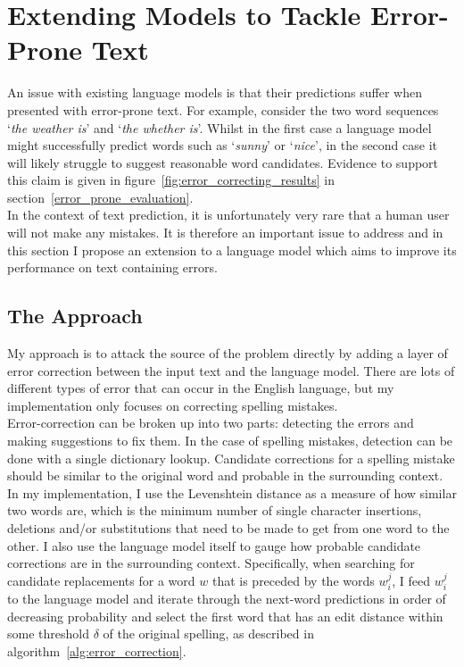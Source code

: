 \documentclass[a4paper, 12pt]{report}
\newcommand{\tit}[1]{\textit{#1}}
\begin{document}
\section{Extending Models to Tackle Error-Prone Text} \label{error_correcting_lm}

An issue with existing language models is that their predictions suffer when presented with error-prone text. For example, consider the two word sequences `\tit{the weather is}' and `\tit{the whether is}'. Whilst in the first case a language model might successfully predict words such as `\tit{sunny}' or `\tit{nice}', in the second case it will likely struggle to suggest reasonable word candidates. Evidence to support this claim is given in figure~\ref{fig:error_correcting_results} in section~\ref{error_prone_evaluation}. \\

In the context of text prediction, it is unfortunately very rare that a human user will not make any mistakes. It is therefore an important issue to address and in this section I propose an extension to a language model which aims to improve its performance on text containing errors.

\subsection{The Approach}

My approach is to attack the source of the problem directly by adding a layer of error correction between the input text and the language model. There are lots of different types of error that can occur in the English language, but my implementation only focuses on correcting spelling mistakes. \\

Error-correction can be broken up into two parts: detecting the errors and making suggestions to fix them. In the case of spelling mistakes, detection can be done with a single dictionary lookup. Candidate corrections for a spelling mistake should be similar to the original word and probable in the surrounding context. In my implementation, I use the Levenshtein distance as a measure of how similar two words are, which is the minimum number of single character insertions, deletions and/or substitutions that need to be made to get from one word to the other. I also use the language model itself to gauge how probable candidate corrections are in the surrounding context. Specifically, when searching for candidate replacements for a word $w$ that is preceded by the words $w_i^j$, I feed $w_i^j$ to the language model and iterate through the next-word predictions in order of decreasing probability and select the first word that has an edit distance within some threshold $\delta$ of the original spelling, as described in algorithm~\ref{alg:error_correction}.
\end{document}
